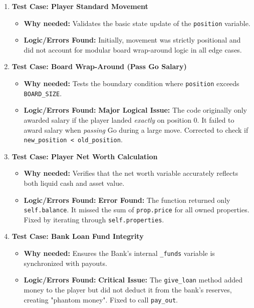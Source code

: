 \documentclass{article}
\begin{document}
\begin{enumerate}
    \item \textbf{Test Case: Player Standard Movement}
    \begin{itemize}
        \item \textbf{Why needed:} Validates the basic state update of the \texttt{position} variable.
        \item \textbf{Logic/Errors Found:} Initially, movement was strictly positional and did not account for modular board wrap-around logic in all edge cases.
    \end{itemize}

    \item \textbf{Test Case: Board Wrap-Around (Pass Go Salary)}
    \begin{itemize}
        \item \textbf{Why needed:} Tests the boundary condition where \texttt{position} exceeds \texttt{BOARD_SIZE}.
        \item \textbf{Logic/Errors Found:} \textbf{Major Logical Issue:} The code originally only awarded salary if the player landed \textit{exactly} on position 0. It failed to award salary when \textit{passing} Go during a large move. Corrected to check if \texttt{new_position < old_position}.
    \end{itemize}

    \item \textbf{Test Case: Player Net Worth Calculation}
    \begin{itemize}
        \item \textbf{Why needed:} Verifies that the net worth variable accurately reflects both liquid cash and asset value.
        \item \textbf{Logic/Errors Found:} \textbf{Error Found:} The function returned only \texttt{self.balance}. It missed the sum of \texttt{prop.price} for all owned properties. Fixed by iterating through \texttt{self.properties}.
    \end{itemize}

    \item \textbf{Test Case: Bank Loan Fund Integrity}
    \begin{itemize}
        \item \textbf{Why needed:} Ensures the Bank's internal \texttt{_funds} variable is synchronized with payouts.
        \item \textbf{Logic/Errors Found:} \textbf{Critical Issue:} The \texttt{give_loan} method added money to the player but did not deduct it from the bank's reserves, creating "phantom money". Fixed to call \texttt{pay_out}.
    \end{itemize}


\end{enumerate}
\end{document}
